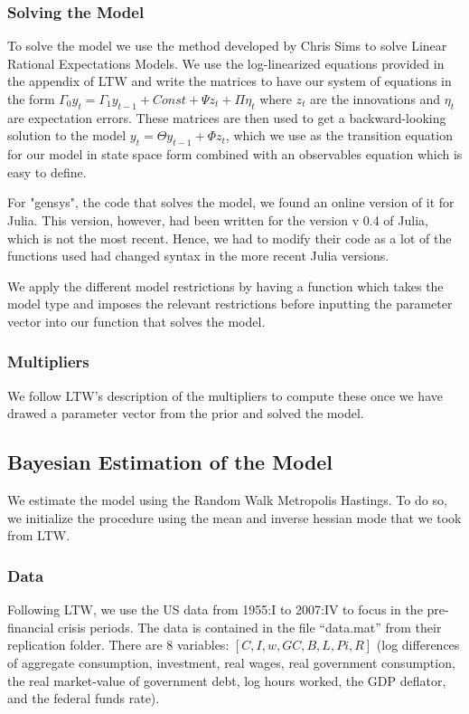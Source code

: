 \documentclass[letterpaper,12pt]{article}%
\begin{document}
\subsubsection*{Solving the Model}
To solve the model we use the method developed by Chris Sims to solve Linear Rational Expectations Models. We use the log-linearized equations provided in the appendix of LTW and write the matrices to have our system of equations in the form $\Gamma_0 y_{t}=\Gamma_1 y_{t-1}+Const+\Psi z_t+\Pi \eta_t$ where $z_t$ are the innovations and $\eta_t$ are expectation errors. These matrices are then used to get a backward-looking solution to the model $y_t=\Theta y_{t-1}+ \Phi z_t$, which we use as the transition equation for our model in state space form combined with an observables equation which is easy to define. 

For "gensys", the code that solves the model, we found an online version of it for Julia. This version, however, had been written for the version v 0.4 of Julia, which is not the most recent. Hence, we had to modify their code as a lot of the functions used had changed syntax in the more recent Julia versions.

We apply the different model restrictions by having a function which takes the model type and imposes the relevant restrictions before inputting the parameter vector into our function that solves the model.

\subsubsection*{Multipliers}
We follow LTW's description of the multipliers to compute these once we have drawed a parameter vector from the prior and solved the model.

\subsection{Bayesian Estimation of the Model}
We estimate the model using the Random Walk Metropolis Hastings. To do so, we initialize the procedure using the mean and inverse hessian mode that we took from LTW.

\subsubsection*{Data}
Following LTW, we use the US data from 1955:I to 2007:IV to focus in the pre-financial crisis periods. The data is contained in the file ``data.mat'' from their replication folder. There are 8 variables: $[C, I, w, GC, B, L, Pi, R]$ (log differences of aggregate consumption, investment, real wages, real government consumption, the real market-value of government debt, log hours worked, the GDP deflator, and the federal funds rate).
\end{document}
